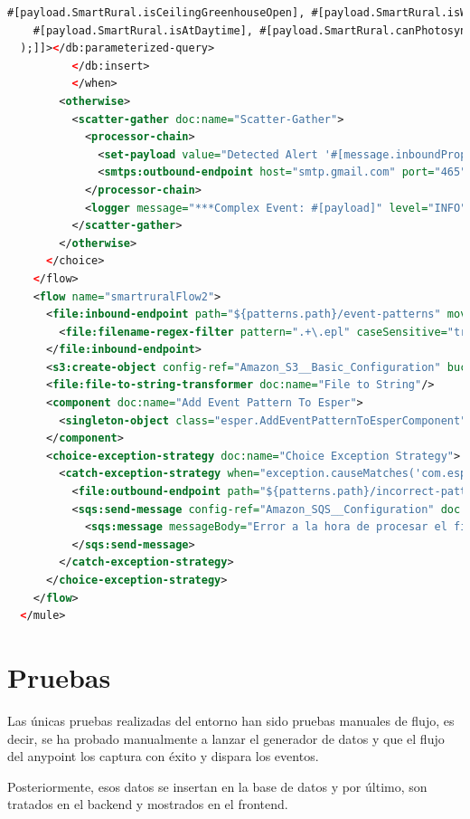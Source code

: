 \documentclass[a4paper,12pt]{article}
\begin{document}
\begin{lstlisting}[language=xml,caption=smart-rural.xml]
    #[payload.SmartRural.isCeilingGreenhouseOpen], #[payload.SmartRural.isWallGreenhouseOpen],
    #[payload.SmartRural.isAtDaytime], #[payload.SmartRural.canPhotosynthesisImprove]
  );]]></db:parameterized-query>
          </db:insert>
          </when>
        <otherwise>
          <scatter-gather doc:name="Scatter-Gather">
            <processor-chain>
              <set-payload value="Detected Alert '#[message.inboundProperties['eventPatternName']]': #[payload]" doc:name="Set Payload"/>
              <smtps:outbound-endpoint host="smtp.gmail.com" port="465" user="${email.username}" password="${email.password}" to="${email.to}" from="${email.from}" subject="Detected Alert" responseTimeout="10000" doc:name="SMTP"/>
            </processor-chain>
            <logger message="***Complex Event: #[payload]" level="INFO" doc:name="Logger"/>
          </scatter-gather>
        </otherwise>
      </choice>
    </flow>
    <flow name="smartruralFlow2">
      <file:inbound-endpoint path="${patterns.path}/event-patterns" moveToDirectory="${patterns.path}/deployed-pattern" pollingFrequency="2000" fileAge="1000" responseTimeout="10000" doc:name="New EPL Event Pattern">
        <file:filename-regex-filter pattern=".+\.epl" caseSensitive="true"/>
      </file:inbound-endpoint>
      <s3:create-object config-ref="Amazon_S3__Basic_Configuration" bucketName="smartrural-isi" key="#[message.inboundProperties.originalFilename]" doc:name="Amazon S3"/>
      <file:file-to-string-transformer doc:name="File to String"/>
      <component doc:name="Add Event Pattern To Esper">
        <singleton-object class="esper.AddEventPatternToEsperComponent"/>
      </component>
      <choice-exception-strategy doc:name="Choice Exception Strategy">
        <catch-exception-strategy when="exception.causeMatches('com.espertech.esper.*')" enableNotifications="false" logException="false" doc:name="Catch Exception Strategy">
          <file:outbound-endpoint path="${patterns.path}/incorrect-pattern" responseTimeout="10000" doc:name="File"/>
          <sqs:send-message config-ref="Amazon_SQS__Configuration" doc:name="Amazon SQS">
            <sqs:message messageBody="Error a la hora de procesar el fichero #[message.inboundProperties.originalFilename]-error"/>
          </sqs:send-message>
        </catch-exception-strategy>
      </choice-exception-strategy>
    </flow>
  </mule>
\end{lstlisting}

\section{Pruebas}
Las únicas pruebas realizadas del entorno han sido pruebas manuales de flujo, es decir, 
se ha probado manualmente a lanzar el generador de datos y que el flujo del anypoint los
captura con éxito y dispara los eventos.

Posteriormente, esos datos se insertan en la base de datos y por último, son tratados en
el backend y mostrados en el frontend.

\clearpage

\nocite{*}


\end{document}
